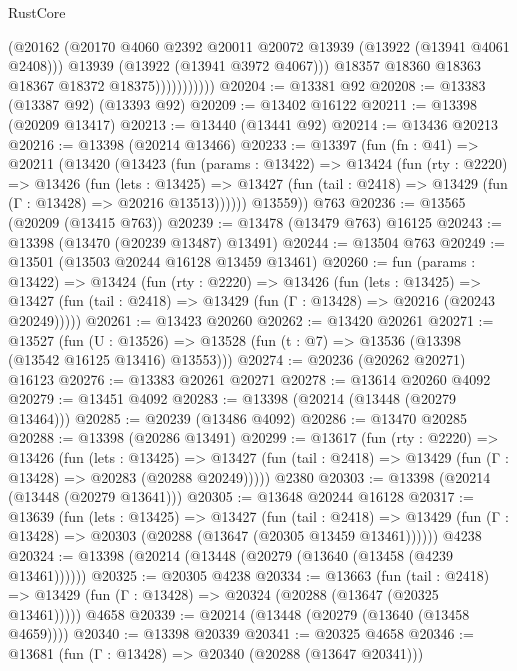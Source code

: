 \begin{lexlean}{RustCore}
\begin{coremodule}
                          (@20162
                            (@20170 @4060 @2392 @20011 @20072 @13939 (@13922 (@13941 @4061 @2408)))
                            @13939
                            (@13922 (@13941 @3972 @4067)))
                          @18357
                          @18360
                          @18363
                          @18367
                          @18372
                          @18375)))))))))))
@20204 := @13381 @92
@20208 := @13383 (@13387 @92) (@13393 @92)
@20209 := @13402 @16122
@20211 := @13398 (@20209 @13417)
@20213 := @13440 (@13441 @92)
@20214 := @13436 @20213
@20216 := @13398 (@20214 @13466)
@20233 := @13397
    (fun (fn : @41) =>
    @20211
      (@13420
        (@13423
          (fun (params : @13422) =>
          @13424
            (fun (rty : @2220) =>
            @13426
              (fun (lets : @13425) =>
              @13427 (fun (tail : @2418) => @13429 (fun (Γ : @13428) => @20216 @13513))))))
        @13559))
    @763
@20236 := @13565 (@20209 (@13415 @763))
@20239 := @13478 (@13479 @763) @16125
@20243 := @13398 (@13470 (@20239 @13487) @13491)
@20244 := @13504 @763
@20249 := @13501 (@13503 @20244 @16128 @13459 @13461)
@20260 := fun (params : @13422) =>
  @13424
    (fun (rty : @2220) =>
    @13426
      (fun (lets : @13425) =>
      @13427 (fun (tail : @2418) => @13429 (fun (Γ : @13428) => @20216 (@20243 @20249)))))
@20261 := @13423 @20260
@20262 := @13420 @20261
@20271 := @13527
    (fun (U : @13526) => @13528 (fun (t : @7) => @13536 (@13398 (@13542 @16125 @13416) @13553)))
@20274 := @20236 (@20262 @20271) @16123
@20276 := @13383 @20261 @20271
@20278 := @13614 @20260 @4092
@20279 := @13451 @4092
@20283 := @13398 (@20214 (@13448 (@20279 @13464)))
@20285 := @20239 (@13486 @4092)
@20286 := @13470 @20285
@20288 := @13398 (@20286 @13491)
@20299 := @13617
    (fun (rty : @2220) =>
    @13426
      (fun (lets : @13425) =>
      @13427 (fun (tail : @2418) => @13429 (fun (Γ : @13428) => @20283 (@20288 @20249)))))
    @2380
@20303 := @13398 (@20214 (@13448 (@20279 @13641)))
@20305 := @13648 @20244 @16128
@20317 := @13639
    (fun (lets : @13425) =>
    @13427
      (fun (tail : @2418) =>
      @13429 (fun (Γ : @13428) => @20303 (@20288 (@13647 (@20305 @13459 @13461))))))
    @4238
@20324 := @13398 (@20214 (@13448 (@20279 (@13640 (@13458 (@4239 @13461))))))
@20325 := @20305 @4238
@20334 := @13663
    (fun (tail : @2418) => @13429 (fun (Γ : @13428) => @20324 (@20288 (@13647 (@20325 @13461)))))
    @4658
@20339 := @20214 (@13448 (@20279 (@13640 (@13458 @4659))))
@20340 := @13398 @20339
@20341 := @20325 @4658
@20346 := @13681 (fun (Γ : @13428) => @20340 (@20288 (@13647 @20341)))

\end{coremodule}
\end{lexlean}
